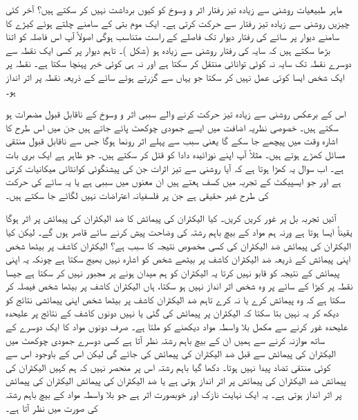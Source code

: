 ماہر طبیعیات روشنی سے زیادہ تیز رفتار اثر و وسوخ کو کیوں برداشت نہیں کر سکتے ہیں؟ آخر کئی چیزیں روشنی سے زیادہ تیز رفتار سے حرکت کرتی ہے۔ ایک موم بتی کے سامنے چلتے ہوئے کیڑے کا سامنے دیوار پر سائے  کی رفتار دیوار تک فاصلے کے راست متناسب ہوگی اصولاً آپ اس فاصلہ کو اتنا بڑھا سکتے ہیں کہ سایہ کی رفتار روشنی سے زیادہ ہو (شکل )۔ تاہم دیوار پر کسی ایک نقطہ سے دوسرے نقطہ تک سایہ نہ کوئی توانائی منتقل کر سکتا ہے اور نہ ہی کوئی خبر پہنچا سکتا ہے۔ نقطہ  پر ایک شخص ایسا کوئی عمل نہیں کر سکتا جو یہاں سے گزرتے ہوئے سائے کے ذریعہ نقطہ  پر اثر انداز ہو۔


اس کے برعکس روشنی سے زیادہ تیز حرکت کرنے والے سببی اثر و وسوخ کے ناقابل قبول مضمرات ہو سکتے ہیں۔ خصوصی نظریہ اضافت میں ایسے جمودی چوکھٹ پائے جاتے ہیں جن میں اس طرح کا اشارہ وقت میں پیچھے جا سکے گا یعنی سبب سے پہلے اثر رونما ہوگا جس سے ناقابل قبول منتقی  مسائل کھڑے ہوتے ہیں۔ مثلاً آپ اپنے نوزائیدہ   دادا کو قتل کر سکتے ہیں۔ جو ظاہر ہے ایک بری بات ہے۔ اب سوال یہ کھڑا ہوتا ہے کہ آیا روشنی سے تیز اثرات جن کی پیشنگوئی  کوانٹائی میکانیات کرتی ہے اور جو ایسپیکٹ کے تجربہ میں کسف ہعتے ہیں ان معنوں میں سببی ہے یا یہ سائے کی حرکت کی طرح غیر حقیقی ہے جن پر فلسفیانہ  اعتراضات نہیں لگائے جا سکتے ہیں۔

آئیں تجربہ بل پر غور کریں کریں۔ کیا الیکٹران کی پیمائش کا ضد الیکٹران کی پیمائش پر اثر ہوگا  یقیناً ایسا ہوتا ہے ورنہ ہم مواد کے بیچ باہم رشتہ کی وضاحت پیش کرنے سائے قاصر ہوں گے۔ لیکن کیا الیکٹران کی پیمائش ضد الیکٹران کی کسی مخصوص نتیجہ کا سبب ہے؟ الیکٹران کاشف پر بیٹھا  شخص اپنی پیمائش کے ذریعہ ضد الیکٹران کاشف پر بیٹھے شخص کو اشارہ نہیں بھیج سکتا ہے چونکہ یہ اپنی پیمائش کے نتیجہ کو قابو نہیں کرتا یہ الیکٹران کو ہم میدان ہونے پر مجبور نہیں  کر سکتا ہے جیسا نقطہ  پر کیڑا کے سائے پر وہ شخص اثر انداز نہیں ہو سکتا، ہاں الیکٹران کاشف پر بیٹھا شخص فیصلہ کر سکتا ہے کہ وہ پیمائش کرے یا نہ کرے تاہم ضد الیکٹران کاشف پر بیٹھا شخص اپنی پیمائشی نتائج کو دیکھ کر یہ نہیں بتا سکتا کہ الیکٹران پر پیمائش کی گئی یا نہیں دونوں کاشف کے نتائج پر علیحدہ علیحدہ غور کرنے سے مکمل بلا واسطہ مواد دیکھنے کو ملتا ہے۔ صرف دونوں مواد کا ایک دوسرے کے ساتھ موازنہ کرنے سے ہمیں ان کے بیچ باہم رشتہ نظر آتا ہے کسی دوسرے جمودی چوکھٹ میں الیکٹران کی پیمائش سے قبل ضد الیکٹران کی پیمائش کی جائے گی لیکن اس کے باوجود اس سے کوئی منتقی تضاد پیدا نہیں ہوتا۔ دکھا گیا باہم رشتہ اس پر منحصر نہیں کہ ہم کہیں الیکٹران کی پیمائش ضد الیکٹران کی پیمائش پر اثر انداز ہوتی ہے یا ضد الیکٹران کی پیمائش الیکٹران کی پیمائش پر اثر انداز ہوتی ہے۔ یہ ایک نہایت نازک اور خوبصورت اثر ہے جو بلا واسطہ مواد کے بیچ باہم رشتہ کی صورت میں نظر آتا ہے۔

